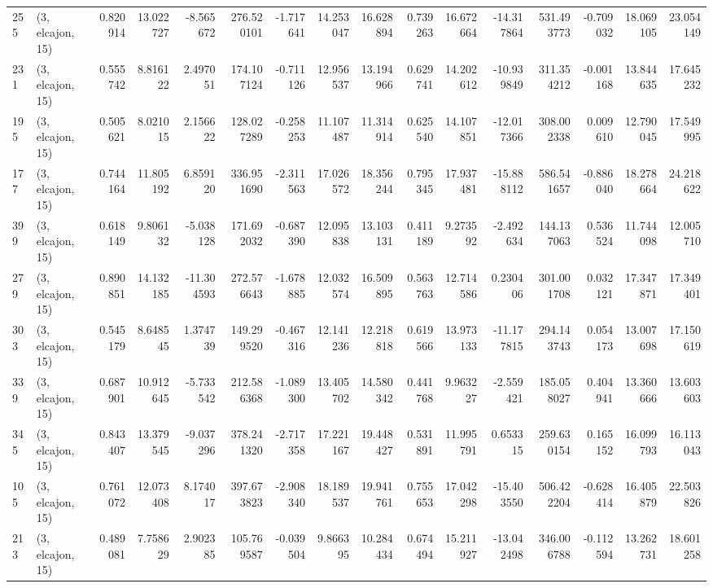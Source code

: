 \begin{tabular}{llrrrrrrrrrrrrrr}
255 &  (3, elcajon, 15) &   0.820914 &  13.022727 &  -8.565672 &   276.520101 &  -1.717641 &  14.253047 &  16.628894 &  0.739263 &  16.672664 & -14.317864 &   531.493773 &  -0.709032 &  18.069105 &  23.054149 \\
231 &  (3, elcajon, 15) &   0.555742 &   8.816122 &   2.497051 &   174.107124 &  -0.711126 &  12.956537 &  13.194966 &  0.629741 &  14.202612 & -10.939849 &   311.354212 &  -0.001168 &  13.844635 &  17.645232 \\
195 &  (3, elcajon, 15) &   0.505621 &   8.021015 &   2.156622 &   128.027289 &  -0.258253 &  11.107487 &  11.314914 &  0.625540 &  14.107851 & -12.017366 &   308.002338 &   0.009610 &  12.790045 &  17.549995 \\
177 &  (3, elcajon, 15) &   0.744164 &  11.805192 &   6.859120 &   336.951690 &  -2.311563 &  17.026572 &  18.356244 &  0.795345 &  17.937481 & -15.888112 &   586.541657 &  -0.886040 &  18.278664 &  24.218622 \\
399 &  (3, elcajon, 15) &   0.618149 &   9.806132 &  -5.038128 &   171.692032 &  -0.687390 &  12.095838 &  13.103131 &  0.411189 &   9.273592 &  -2.492634 &   144.137063 &   0.536524 &  11.744098 &  12.005710 \\
279 &  (3, elcajon, 15) &   0.890851 &  14.132185 & -11.304593 &   272.576643 &  -1.678885 &  12.032574 &  16.509895 &  0.563763 &  12.714586 &   0.230406 &   301.001708 &   0.032121 &  17.347871 &  17.349401 \\
303 &  (3, elcajon, 15) &   0.545179 &   8.648545 &   1.374739 &   149.299520 &  -0.467316 &  12.141236 &  12.218818 &  0.619566 &  13.973133 & -11.177815 &   294.143743 &   0.054173 &  13.007698 &  17.150619 \\
339 &  (3, elcajon, 15) &   0.687901 &  10.912645 &  -5.733542 &   212.586368 &  -1.089300 &  13.405702 &  14.580342 &  0.441768 &   9.963227 &  -2.559421 &   185.058027 &   0.404941 &  13.360666 &  13.603603 \\
345 &  (3, elcajon, 15) &   0.843407 &  13.379545 &  -9.037296 &   378.241320 &  -2.717358 &  17.221167 &  19.448427 &  0.531891 &  11.995791 &   0.653315 &   259.630154 &   0.165152 &  16.099793 &  16.113043 \\
105 &  (3, elcajon, 15) &   0.761072 &  12.073408 &   8.174017 &   397.673823 &  -2.908340 &  18.189537 &  19.941761 &  0.755653 &  17.042298 & -15.403550 &   506.422204 &  -0.628414 &  16.405879 &  22.503826 \\
213 &  (3, elcajon, 15) &   0.489081 &   7.758629 &   2.902385 &   105.769587 &  -0.039504 &   9.866395 &  10.284434 &  0.674494 &  15.211927 & -13.042498 &   346.006788 &  -0.112594 &  13.262731 &  18.601258 \\

\end{tabular}
